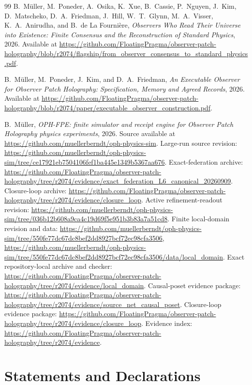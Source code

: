 \documentclass[11pt]{article}
\begin{document}
\begin{thebibliography}{99}
B.~M\"uller, M.~Poneder, A.~Osika, K.~Xue, B.~Cassie, P.~Nguyen, J.~Kim, D.~Matscheko, D.~A.~Friedman, J.~Hill, W.~T.~Glynn, M.~A.~Visser, K.~A.~Anirudha, and B.~de La Fourni\`ere,
\emph{Observers Who Read Their Universe into Existence: Finite Consensus and the Reconstruction of Standard Physics},
2026.
Available at \url{https://github.com/FloatingPragma/observer-patch-holography/blob/r2074/flagship/from_observer_consensus_to_standard_physics.pdf}.

B.~M\"uller, M.~Poneder, J.~Kim, and D.~A.~Friedman,
\emph{An Executable Observer for Observer Patch Holography: Specification, Memory and Agreed Records},
2026.
Available at \url{https://github.com/FloatingPragma/observer-patch-holography/blob/r2074/paper/executable_observer_construction.pdf}.

B.~M\"uller,
\emph{OPH-FPE: finite simulator and receipt engine for Observer Patch Holography physics experiments},
2026.
Source available at \url{https://github.com/muellerberndt/oph-physics-sim}.
Large-run source revision:
\url{https://github.com/muellerberndt/oph-physics-sim/tree/ce17921eb7504106fef1ba445e1349b5367aa676}.
Exact-federation archive:
\url{https://github.com/FloatingPragma/observer-patch-holography/tree/r2074/evidence/exact_federation_L6_canonical_20260909}.
Closure-loop archive:
\url{https://github.com/FloatingPragma/observer-patch-holography/tree/r2074/evidence/closure_loop}.
Active refinement-readout revision:
\url{https://github.com/muellerberndt/oph-physics-sim/tree/036b12b608a9ca4c19d69f5e951b3b83a7a51cd8}.
Finite local-domain revision and data:
\url{https://github.com/muellerberndt/oph-physics-sim/tree/550fe77dc67dc8bef2dd8927bcf72ec98cfa3506},
\url{https://github.com/muellerberndt/oph-physics-sim/tree/550fe77dc67dc8bef2dd8927bcf72ec98cfa3506/data/local_domain}.
Exact repository-local archive and checker:
\url{https://github.com/FloatingPragma/observer-patch-holography/tree/r2074/evidence/local_domain}.
Causal-poset evidence package:
\url{https://github.com/FloatingPragma/observer-patch-holography/tree/r2074/evidence/source_net_causal_poset}.
Closure-loop evidence package:
\url{https://github.com/FloatingPragma/observer-patch-holography/tree/r2074/evidence/closure_loop}.
Evidence index:
\url{https://github.com/FloatingPragma/observer-patch-holography/tree/r2074/evidence}.

\end{thebibliography}

\section*{Statements and Declarations}
\end{document}
